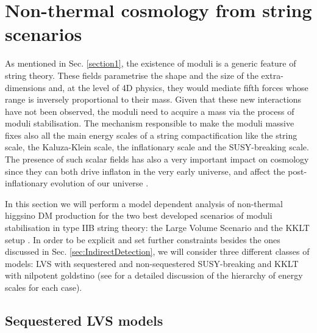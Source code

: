 \documentclass[11pt,a4paper]{article}
\begin{document}
\section{Non-thermal cosmology from string scenarios}
\label{sec:DirectDetection}

As mentioned in Sec. \ref{section1}, the existence of moduli is a generic feature of string theory. These fields parametrise the shape and the size of the extra-dimensions and, at the level of 4D physics, they would mediate fifth forces whose range is inversely proportional to their mass. Given that these new interactions have not been observed, the moduli need to acquire a mass via the process of moduli stabilisation. The mechanism responsible to make the moduli massive fixes also all the main energy scales of a string compactification like the string scale, the Kaluza-Klein scale, the inflationary scale and the SUSY-breaking scale. The presence of such scalar fields has also a very important impact on cosmology since they can both drive inflaton in the very early universe, and affect the post-inflationary evolution of our universe \cite{NTDM,Allahverdi:2013noa,Allahverdi:2014ppa,Aparicio:2015sda,Cicoli:2015bpq}.

In this section we will perform a model dependent analysis of non-thermal higgsino DM production for the two best developed scenarios of moduli stabilisation in type IIB string theory: the Large Volume Scenario \cite{Balasubramanian:2005zx} and the KKLT setup \cite{Kachru:2003aw}. In order to be explicit and set further constraints besides the ones discussed in Sec. \ref{sec:IndirectDetection}, we will consider three different classes of models: LVS with sequestered and non-sequestered SUSY-breaking and KKLT with nilpotent goldstino (see \cite{Aparicio:2015psl} for a detailed discussion of the hierarchy of energy scales for each case).


\subsection{Sequestered LVS models}
\end{document}
